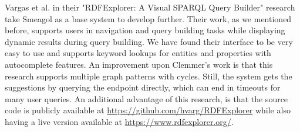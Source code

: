 Vargas et al. in their "RDFExplorer: A Visual SPARQL Query Builder" research take Smeagol as a base system to develop further. Their work, as we mentioned before, supports users in navigation and query building tasks while displaying dynamic results during query building. We have found their interface to be very easy to use and supports keyword lookups for entities and properties with autocomplete features. An improvement upon Clemmer's work is that this research supports multiple graph patterns with cycles. Still, the system gets the suggestions by querying the endpoint directly, which can end in timeouts for many user queries. An additional advantage of this research, is that the source code is publicly available at \url{https://github.com/hvarg/RDFExplorer} while also having a live version available at \url{https://www.rdfexplorer.org/}.